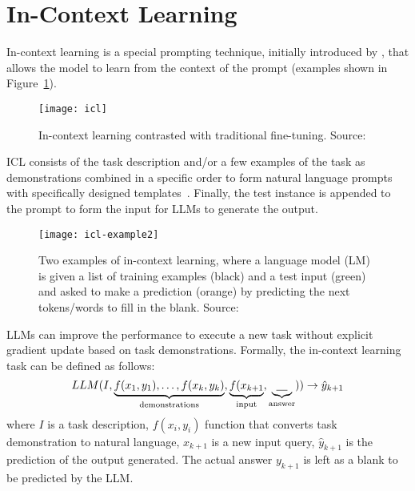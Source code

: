 \section{In-Context Learning}
\label{sec:in-context-learning}
In-context learning is a special prompting technique, initially introduced by \textcite{brown2020language}, that allows the model to learn from the context of the prompt (examples shown in Figure~\ref{fig:in-context-learning}).
\begin{figure}[h!]
	\centering
	\texttt{[image: icl]}
	\caption{In-context learning contrasted with traditional fine-tuning. Source: \textcite{brown2020language}}
	\label{fig:in-context-learning}
\end{figure}
ICL consists of the task description and/or a few examples of the task as demonstrations combined in a specific order to form natural language prompts with specifically designed templates~\cite{brown2020language}.
Finally, the test instance is appended to the prompt to form the input for LLMs to generate the output.
\begin{figure}
	\centering
	\texttt{[image: icl-example2]}
	\caption{Two examples of in-context learning, where a language model (LM) is given a list of training examples (black) and a test input (green) and asked to make a prediction (orange) by predicting the next tokens/words to fill in the blank. Source: \textcite{stanford2023understandingincontext}}
	\label{fig:icl-example2}
\end{figure}
LLMs can improve the performance to execute a new task without explicit gradient update based on task demonstrations.
Formally, the in-context learning task can be defined as follows:
\begin{equation}
	LLM(I, \underbrace{f(x_1, y_1), \dots, f(x_k, y_k)}_\text{demonstrations}, \underbrace{f(x_{k+1}}_\text{input}, \underbrace{\uline{~~~}}_\text{answer})) \rightarrow \hat{y}_{k+1}
	\label{eq:ict}
\end{equation}
where $I$ is a task description, $f(x_i, y_i)$ function that converts task demonstration to natural language, $x_{k+1}$ is a new input query, $\hat{y}_{k+1}$ is the prediction of the output generated.
The actual answer $y_{k+1}$ is left as a blank to be predicted by the LLM\@.

